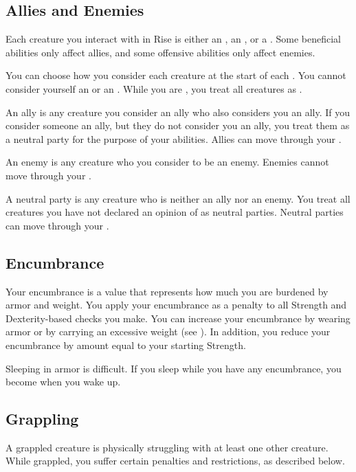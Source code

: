     \subsection{Allies and Enemies}\label{Allies and Enemies}
        Each creature you interact with in Rise is either an , an , or a .
        Some beneficial abilities only affect allies, and some offensive abilities only affect enemies.

        You can choose how you consider each creature at the start of each .
        You cannot consider yourself an  or an .
        While you are , you treat all creatures as .

         An ally is any creature you consider an ally who also considers you an ally.
        If you consider someone an ally, but they do not consider you an ally, you treat them as a neutral party for the purpose of your abilities.
        Allies can move through your .

         An enemy is any creature who you consider to be an enemy.
        Enemies cannot move through your .

         A neutral party is any creature who is neither an ally nor an enemy.
        You treat all creatures you have not declared an opinion of as neutral parties.
        Neutral parties can move through your .

    \subsection{Encumbrance}\label{Encumbrance}
        Your encumbrance is a value that represents how much you are burdened by armor and weight.
        You apply your encumbrance as a penalty to all Strength and Dexterity-based checks you make.
        You can increase your encumbrance by wearing armor or by carrying an excessive weight (see ).
        In addition, you reduce your encumbrance by amount equal to your starting Strength.

        Sleeping in armor is difficult.
        If you sleep while you have any encumbrance, you become  when you wake up.

    \subsection{Grappling}\label{Grappling}
        A grappled creature is physically struggling with at least one other creature.
        While grappled, you suffer certain penalties and restrictions, as described below.

